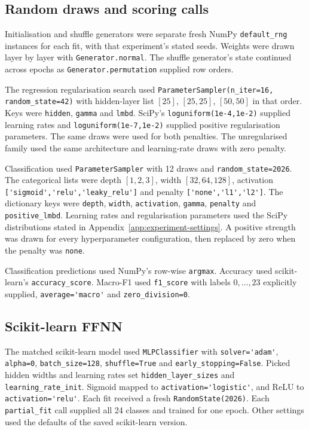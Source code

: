 \subsection{Random draws and scoring calls}
Initialisation and shuffle generators were separate fresh NumPy
\nolinkurl{default_rng} instances for each fit, with that experiment's
stated seeds. Weights were drawn layer by layer with
\nolinkurl{Generator.normal}. The shuffle generator's state continued
across epochs as \nolinkurl{Generator.permutation} supplied row orders.

The regression regularisation search used
\nolinkurl{ParameterSampler(n_iter=16, random_state=42)} with hidden-layer
list $[25]$, $[25,25]$, $[50,50]$ in that order. Keys were
\nolinkurl{hidden}, \nolinkurl{gamma} and \nolinkurl{lmbd}.
SciPy's \nolinkurl{loguniform(1e-4,1e-2)} supplied learning rates and
\nolinkurl{loguniform(1e-7,1e-2)} supplied positive regularisation parameters. The same
draws were used for both penalties. The unregularised family used the
same architecture and learning-rate draws with zero penalty.

Classification used \nolinkurl{ParameterSampler} with 12 draws and
\nolinkurl{random_state=2026}. The categorical lists were depth
$[1,2,3]$, width $[32,64,128]$, activation
\nolinkurl{['sigmoid','relu','leaky_relu']} and penalty
\nolinkurl{['none','l1','l2']}. The dictionary keys were
\nolinkurl{depth}, \nolinkurl{width}, \nolinkurl{activation},
\nolinkurl{gamma}, \nolinkurl{penalty} and \nolinkurl{positive_lmbd}.
Learning rates and regularisation parameters used the SciPy distributions stated in Appendix~\ref{app:experiment-settings}.
A positive strength was drawn for every hyperparameter configuration, then replaced by zero
when the penalty was \nolinkurl{none}.

Classification predictions used NumPy's row-wise \nolinkurl{argmax}.
Accuracy used scikit-learn's \nolinkurl{accuracy_score}. Macro-F1 used
\nolinkurl{f1_score} with labels $0,\ldots,23$ explicitly supplied,
\nolinkurl{average='macro'} and \nolinkurl{zero_division=0}.

\subsection{Scikit-learn FFNN}
The matched scikit-learn model used \nolinkurl{MLPClassifier} with
\nolinkurl{solver='adam'}, \nolinkurl{alpha=0},
\nolinkurl{batch_size=128}, \nolinkurl{shuffle=True} and
\nolinkurl{early_stopping=False}. Picked hidden widths and learning rates set
\nolinkurl{hidden_layer_sizes} and \nolinkurl{learning_rate_init}.
Sigmoid mapped to \nolinkurl{activation='logistic'}, and ReLU to
\nolinkurl{activation='relu'}. Each fit received a fresh
\nolinkurl{RandomState(2026)}. Each \nolinkurl{partial_fit} call supplied
all 24 classes and trained for one epoch. Other settings used the
defaults of the saved scikit-learn version.

